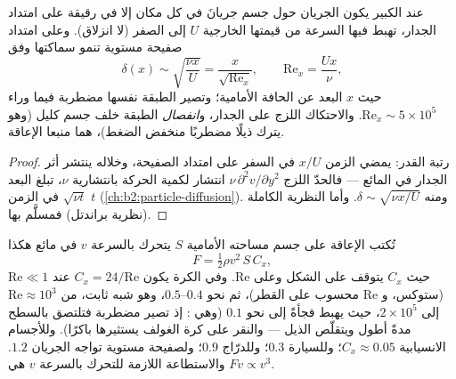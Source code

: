 \begin{proposition}\label{prop:b2:viscous-flows:bl}
عند  الكبير يكون الجريان حول جسم جريانَ  في كل مكان إلا في \emph{} رقيقة على امتداد الجدار،
تهبط فيها السرعة من قيمتها الخارجية $U$ إلى الصفر (لا انزلاق).
وعلى امتداد صفيحة مستوية تنمو سماكتها وفق
\[
\delta(x) \sim \sqrt{\frac{\nu x}{U}} = \frac{x}{\sqrt{\mathrm{Re}_x}} ,
\qquad \mathrm{Re}_x = \frac{Ux}{\nu} ,
\]
حيث $x$ البعد عن الحافة الأمامية؛ وتصير الطبقة نفسها
مضطربة فيما وراء $\mathrm{Re}_x \sim 5 \times 10^5$. والاحتكاك اللزج على
الجدار، و\emph{انفصال} الطبقة خلف جسم كليل (وهو يترك ذيلًا
مضطربًا منخفض الضغط)، هما منبعا الإعاقة.
\end{proposition}

\begin{proof}
رتبة القدر: يمضي  الزمن $x/U$ في السفر
على امتداد الصفيحة، وخلاله ينتشر أثر الجدار في
المائع --- فالحدّ اللزج $\nu\,\partial^2v/\partial y^2$ انتشار
لكمية الحركة بانتشارية $\nu$، تبلغ البعد $\sqrt{\nu t}$ في
الزمن $t$ (\cref{ch:b2:particle-diffusion}). ومنه $\delta \sim \sqrt{\nu x
/U}$. وأما النظرية الكاملة (نظرية براندتل) فمسلَّم بها.
\end{proof}

\begin{proposition}\label{prop:b2:viscous-flows:drag}
تُكتب الإعاقة على جسم مساحته الأمامية $S$ يتحرك بالسرعة $v$ في
مائع هكذا
\[
F = \tfrac12\rho v^2\,S\,C_x ,
\]
حيث \emph{} $C_x$ يتوقف على الشكل وعلى
$\mathrm{Re}$. وفي الكرة يكون $C_x = 24/\mathrm{Re}$ عند $\mathrm{Re} \ll 1$ (ستوكس،
و $\mathrm{Re}$ محسوب على القطر)، ثم نحو $0.4$--$0.5$، وهو شبه
ثابت، من $\mathrm{Re} \approx 10^3$ إلى $2 \times 10^5$، حيث يهبط
فجأةً إلى نحو $0.1$ (وهي \emph{}: إذ تصير 
مضطربة فتلتصق بالسطح مدةً أطول ويتقلّص الذيل --- والنقر
على كرة الغولف يستثيرها باكرًا). وللأجسام الانسيابية
$C_x \approx 0.05$؛ وللسيارة $0.3$؛ وللدرّاج $0.9$؛ ولصفيحة مستوية تواجه الجريان
$1.2$. والاستطاعة اللازمة للتحرك بالسرعة $v$ هي $Fv \propto v^3$.
\end{proposition}
\admitted

